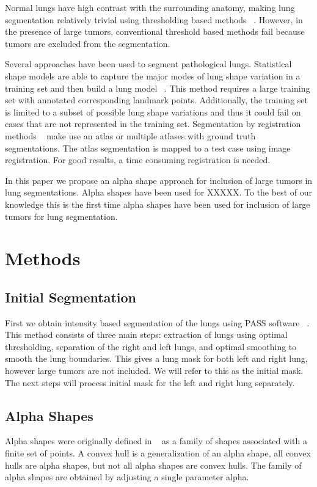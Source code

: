 \documentclass{llncs}
\begin{document}
Normal lungs have high contrast with the surrounding anatomy, making lung segmentation relatively trivial using thresholding based methods ~\cite{guo2008,hu2001}. However, in the presence of large tumors, conventional threshold based methods fail because tumors are excluded from the segmentation.

Several approaches have been used to segment pathological lungs. Statistical shape models are able to capture the major modes of lung shape variation in a training set and then build a lung model ~\cite{sun2012,sofka2011}. This method requires a large training set with annotated corresponding landmark points. Additionally, the training set is limited to a subset of possible lung shape variations and thus it could fail on cases that are not represented in the training set. Segmentation by registration methods ~\cite{sluimer2005,vanrikxoort2009} make use an atlas or multiple atlases with ground truth segmentations. The atlas segmentation is mapped to a test case using image registration. For good results, a time consuming registration is needed.

In this paper we propose an alpha shape approach for inclusion of large tumors in lung segmentations. Alpha shapes have been used for XXXXX. To the best of our knowledge this is the first time alpha shapes have been used for inclusion of large tumors for lung segmentation.


%
\section{Methods}
%

%
\subsection{Initial Segmentation}
%
First we obtain intensity based segmentation of the lungs using PASS software ~\cite{guo2008}. This method consists of three main steps: extraction of lungs using optimal thresholding, separation of the right and left lungs, and optimal smoothing to smooth the lung boundaries. This gives a lung mask for both left and right lung, however large tumors are not included. We will refer to this as the initial mask. The next steps will process initial mask for the left and right lung separately. 
%
\subsection{Alpha Shapes}
%
Alpha shapes were originally defined in ~\cite{edelsbrunner1983} as a family of shapes associated with a finite set of points. A convex hull is a generalization of an alpha shape, all convex hulls are alpha shapes, but not all alpha shapes are convex hulls. The family of alpha shapes are obtained by adjusting a single parameter alpha. 
\end{document}
